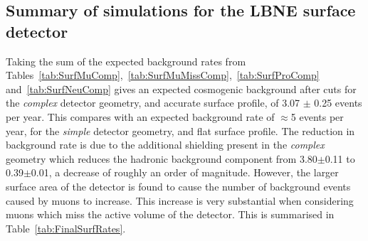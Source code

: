 \subsection{Summary of simulations for the LBNE surface detector}
Taking the sum of the expected background rates from Tables~\ref{tab:SurfMuComp},~\ref{tab:SurfMuMissComp},~\ref{tab:SurfProComp} and~\ref{tab:SurfNeuComp} gives an expected cosmogenic background after cuts for the \emph{complex} detector geometry, and accurate surface profile, of 3.07 $\pm$ 0.25 events per year. This compares with an expected background rate of $\approx$5 events per year, for the \emph{simple} detector geometry, and flat surface profile. The reduction in background rate is due to the additional shielding present in the \emph{complex} geometry which reduces the hadronic background component from 3.80$\pm$0.11 to 0.39$\pm$0.01, a decrease of roughly an order of magnitude. However, the larger surface area of the detector is found to cause the number of background events caused by muons to increase. This increase is very substantial when considering muons which miss the active volume of the detector. This is summarised in Table~\ref{tab:FinalSurfRates}. \\


